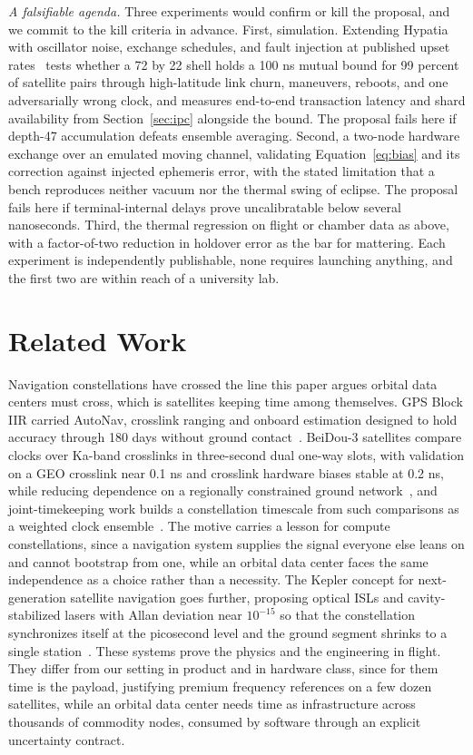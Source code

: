 \documentclass[twocolumn,10pt]{article}
\newcommand{\runin}[1]{\smallskip\noindent\textit{#1.}\hspace{0.6em}}
\begin{document}
\runin{A falsifiable agenda}
Three experiments would confirm or kill the proposal, and we commit to the kill criteria in advance. First, simulation. Extending Hypatia~\cite{kassing2020} with oscillator noise, exchange schedules, and fault injection at published upset rates~\cite{pfandzelter2023} tests whether a 72 by 22 shell holds a 100 ns mutual bound for 99 percent of satellite pairs through high-latitude link churn, maneuvers, reboots, and one adversarially wrong clock, and measures end-to-end transaction latency and shard availability from Section~\ref{sec:ipc} alongside the bound. The proposal fails here if depth-47 accumulation defeats ensemble averaging. Second, a two-node hardware exchange over an emulated moving channel, validating Equation~\ref{eq:bias} and its correction against injected ephemeris error, with the stated limitation that a bench reproduces neither vacuum nor the thermal swing of eclipse. The proposal fails here if terminal-internal delays prove uncalibratable below several nanoseconds. Third, the thermal regression on flight or chamber data as above, with a factor-of-two reduction in holdover error as the bar for mattering. Each experiment is independently publishable, none requires launching anything, and the first two are within reach of a university lab.

\section{Related Work}\label{sec:related}
Navigation constellations have crossed the line this paper argues orbital data centers must cross, which is satellites keeping time among themselves. GPS Block IIR carried AutoNav, crosslink ranging and onboard estimation designed to hold accuracy through 180 days without ground contact~\cite{autonav}. BeiDou-3 satellites compare clocks over Ka-band crosslinks in three-second dual one-way slots, with validation on a GEO crosslink near 0.1 ns and crosslink hardware biases stable at 0.2 ns, while reducing dependence on a regionally constrained ground network~\cite{li2025}, and joint-timekeeping work builds a constellation timescale from such comparisons as a weighted clock ensemble~\cite{sensors2020}. The motive carries a lesson for compute constellations, since a navigation system supplies the signal everyone else leans on and cannot bootstrap from one, while an orbital data center faces the same independence as a choice rather than a necessity. The Kepler concept for next-generation satellite navigation goes further, proposing optical ISLs and cavity-stabilized lasers with Allan deviation near $10^{-15}$ so that the constellation synchronizes itself at the picosecond level and the ground segment shrinks to a single station~\cite{gunther2018}. These systems prove the physics and the engineering in flight. They differ from our setting in product and in hardware class, since for them time is the payload, justifying premium frequency references on a few dozen satellites, while an orbital data center needs time as infrastructure across thousands of commodity nodes, consumed by software through an explicit uncertainty contract.
\end{document}
